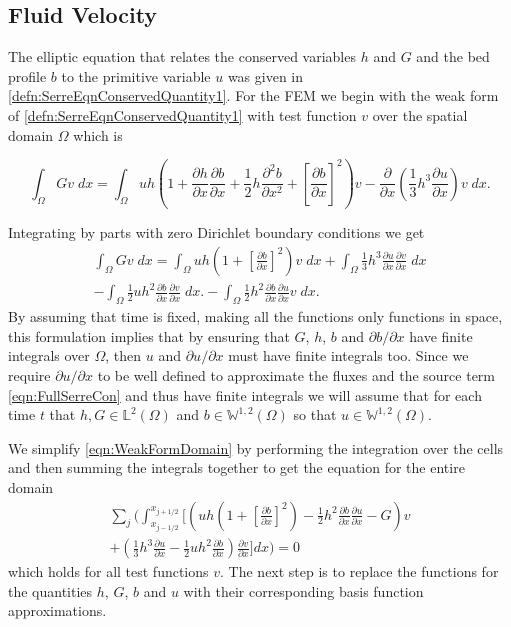 \subsection{Fluid Velocity}
\label{subsec:FluidVelocity}
The elliptic equation that relates the conserved variables $h$ and $G$ and the bed profile $b$ to the primitive variable $u$ was given in \eqref{defn:SerreEqnConservedQuantity1}. For the FEM we begin with the weak form of \eqref{defn:SerreEqnConservedQuantity1} with test function $v$ over the spatial domain $\Omega$ which is 

\begin{equation*}
	\int_{\Omega } G v \; dx =  \int_{\Omega } uh \left(1 + \frac{\partial h}{\partial x}\frac{\partial b}{\partial x} + \frac{1}{2}h\frac{\partial^2 b}{\partial x^2} +  \left[\frac{\partial b}{\partial x}\right]^2 \right) v - \frac{\partial}{\partial x}\left(\frac{1}{3}h^3  \frac{\partial {u}}{\partial x}\right) v \; dx.
\end{equation*}

Integrating by parts with zero Dirichlet boundary conditions we get
\begin{multline}
\int_{\Omega } G v \; dx = \int_{\Omega } uh \left(1 + \left[\frac{\partial b}{\partial x}\right]^2 \right) v \; dx +  \int_{\Omega } \frac{1}{3}h^3  \frac{\partial {u}}{\partial x} \frac{\partial v}{\partial x} \; dx  \\ - 
\int_{\Omega }   \frac{1}{2} u h^2\frac{\partial b}{\partial x}  \frac{\partial v }{\partial x}\; dx. - 
\int_{\Omega }   \frac{1}{2}h^2\frac{\partial b}{\partial x}  \frac{\partial u }{\partial x}v \; dx.
\label{eqn:WeakFormDomain}
\end{multline}
By assuming that time is fixed, making all the functions only functions in space, this formulation implies that by ensuring that $G$, $h$, $b$ and $\partial b / \partial x$ have finite integrals over $\Omega$, then $u$ and $\partial u / \partial x$ must have finite integrals too. Since we require $\partial u / \partial x$ to be well defined to approximate the fluxes and the source term \eqref{eqn:FullSerreCon} and thus have finite integrals we will assume that for each time $t$ that $h,G \in \mathbb{L}^2(\Omega)$ and $b \in\mathbb{W}^{1,2}(\Omega)$ so that $u \in \mathbb{W}^{1,2}(\Omega)$. 

We simplify \eqref{eqn:WeakFormDomain} by performing the integration over the cells and then summing the integrals together to get the equation for the entire domain
\begin{multline}
\label{eq:elementwiseint}
 \sum_{j} \Bigg(  \int_{x_{j-1/2} }^{{x_{j+1/2}}} \Bigg[  \left( uh \left(1 + \left[\frac{\partial b}{\partial x}\right]^2 \right)  - \frac{1}{2}h^2\frac{\partial b}{\partial x}  \frac{\partial u }{\partial x}  -  G \right) v   \\ +  \left(\frac{1}{3}h^3  \frac{\partial {u}}{\partial x}    -     \frac{1}{2} uh^2\frac{\partial b}{\partial x}    \right) \frac{\partial v }{\partial x} \Bigg]dx \Bigg)  = 0
\end{multline}
which holds for all test functions $v$. The next step is to replace the functions for the quantities $h$, $G$, $b$ and $u$ with their corresponding basis function approximations. 

